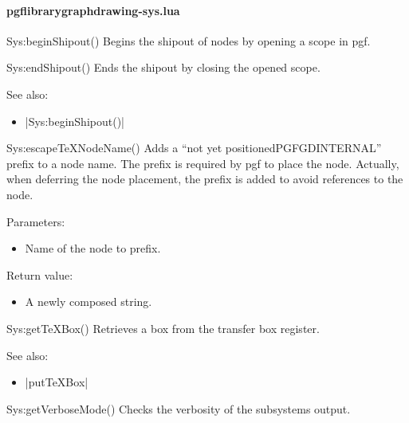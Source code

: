 
\paragraph{pgflibrarygraphdrawing-sys.lua}


\begin{luacommand}{{Sys:beginShipout}()}
Begins the shipout of nodes by opening a scope in pgf.



\end{luacommand}\begin{luacommand}{{Sys:endShipout}()}
Ends the shipout by closing the opened scope.



See also:
\begin{itemize}
	\item[] |Sys:beginShipout()|
\end{itemize}

\end{luacommand}\begin{luacommand}{{Sys:escapeTeXNodeName}()}
Adds a ``not yet positionedPGFGDINTERNAL'' prefix to a node name. The prefix is required by pgf to place the node. Actually, when deferring the node placement, the prefix is added to avoid references to the node.

Parameters:
\begin{itemize}
	\item[]  \subitem Name of the node to prefix.
\end{itemize}


Return value:
\begin{itemize} \item[] A newly composed string. \end{itemize}


\end{luacommand}\begin{luacommand}{{Sys:getTeXBox}()}
Retrieves a box from the transfer box register.



See also:
\begin{itemize}
	\item[] |putTeXBox|
\end{itemize}

\end{luacommand}\begin{luacommand}{{Sys:getVerboseMode}()}
Checks the verbosity of the subsystems output.



\end{luacommand}
